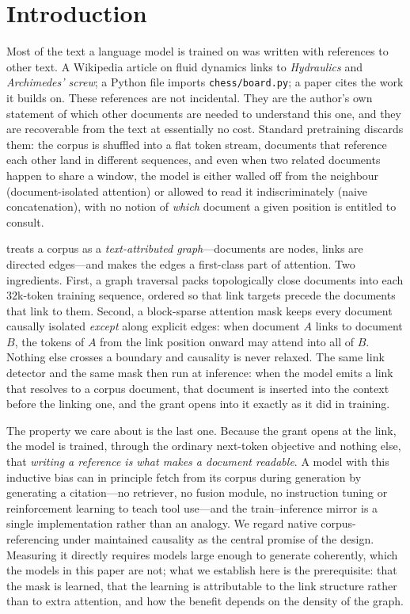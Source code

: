 \section{Introduction}
\label{sec:intro}

Most of the text a language model is trained on was written with references to other
text. A Wikipedia article on fluid dynamics links to \emph{Hydraulics} and
\emph{Archimedes' screw}; a Python file imports \texttt{chess/board.py}; a paper cites
the work it builds on. These references are not incidental. They are the author's own
statement of which other documents are needed to understand this one, and they are
recoverable from the text at essentially no cost. Standard pretraining discards them:
the corpus is shuffled into a flat token stream, documents that reference each other
land in different sequences, and even when two related documents happen to share a
window, the model is either walled off from the neighbour (document-isolated attention)
or allowed to read it indiscriminately (naive concatenation), with no notion of
\emph{which} document a given position is entitled to consult.

\method treats a corpus as a \emph{text-attributed graph}---documents are nodes, links
are directed edges---and makes the edges a first-class part of attention. Two
ingredients. First, a graph traversal packs topologically close documents into each
$32$k-token training sequence, ordered so that link targets precede the documents that
link to them. Second, a block-sparse attention mask keeps every document causally
isolated \emph{except} along explicit edges: when document $A$ links to document $B$,
the tokens of $A$ from the link position onward may attend into all of $B$. Nothing
else crosses a boundary and causality is never relaxed. The same link detector and the
same mask then run at inference: when the model emits a link that resolves to a corpus
document, that document is inserted into the context before the linking one, and the
grant opens into it exactly as it did in training.

The property we care about is the last one. Because the grant opens at the link, the
model is trained, through the ordinary next-token objective and nothing else, that
\emph{writing a reference is what makes a document readable}. A model with this
inductive bias can in principle fetch from its corpus during generation by generating a
citation---no retriever, no fusion module, no instruction tuning or reinforcement
learning to teach tool use---and the train--inference mirror is a single implementation
rather than an analogy. We regard native corpus-referencing under maintained causality
as the central promise of the design. Measuring it directly requires models large
enough to generate coherently, which the models in this paper are not; what we
establish here is the prerequisite: that the mask is learned, that the learning is
attributable to the link structure rather than to extra attention, and how the benefit
depends on the density of the graph.

